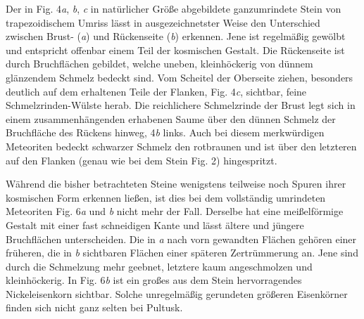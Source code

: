 \documentclass[a4paper, 11pt, oneside, german]{article}
\begin{document}
Der in Fig. 4\emph{a}, \emph{b}, \emph{c} in natürlicher Größe abgebildete ganzumrindete Stein von trapezoidischem Umriss lässt in ausgezeichnetster Weise den Unterschied zwischen Brust- (\emph{a}) und Rückenseite (\emph{b}) erkennen. Jene ist regelmäßig gewölbt und entspricht offenbar einem Teil der kosmischen Gestalt. Die Rückenseite ist durch Bruchflächen gebildet, welche uneben, kleinhöckerig von dünnem glänzendem Schmelz bedeckt sind. Vom Scheitel der Oberseite ziehen, besonders deutlich auf dem erhaltenen Teile der Flanken, Fig. 4\emph{c}, sichtbar, feine Schmelzrinden-Wülste herab. Die reichlichere Schmelzrinde der Brust legt sich in einem zusammenhängenden erhabenen Saume über den dünnen Schmelz der Bruchfläche des Rückens hinweg, 4\emph{b} links. Auch bei diesem merkwürdigen Meteoriten bedeckt schwarzer Schmelz den rotbraunen und ist über den letzteren auf den Flanken (genau wie bei dem Stein Fig. 2) hingespritzt.

Während die bisher betrachteten Steine wenigstens teilweise noch Spuren ihrer kosmischen Form erkennen ließen, ist dies bei dem vollständig umrindeten Meteoriten Fig. 6\emph{a} und \emph{b} nicht mehr der Fall. Derselbe hat eine meißelförmige Gestalt mit einer fast schneidigen Kante und lässt ältere und jüngere Bruchflächen unterscheiden. Die in \emph{a} nach vorn gewandten Flächen gehören einer früheren, die in \emph{b} sichtbaren Flächen einer späteren Zertrümmerung an. Jene sind durch die Schmelzung mehr geebnet, letztere kaum angeschmolzen und kleinhöckerig. In Fig. 6\emph{b} ist ein großes aus dem Stein hervorragendes Nickeleisenkorn sichtbar. Solche unregelmäßig gerundeten größeren Eisenkörner finden sich nicht ganz selten bei Pultusk.
\end{document}
